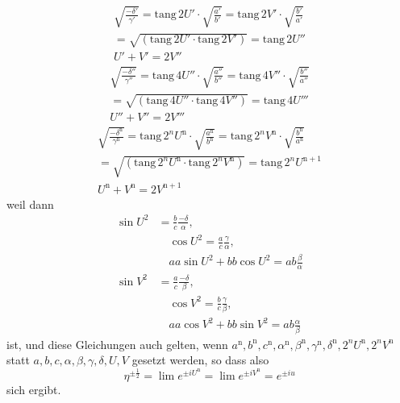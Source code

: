 \[
\begin{gathered}
\surd{\frac{-\delta'}{\gamma'}}
=\mathrm{tang}\,2U'\cdot\surd{\frac{a'}{b'}}
=\mathrm{tang}\,2V'\cdot\surd{\frac{b'}{a'}}
\\=\surd{(\mathrm{tang}\,2U'\cdot\mathrm{tang}\,2V')}
=\mathrm{tang}\,2U''\\
U'+V'=2V''
\end{gathered}
\]
\[
\begin{gathered}
\surd{\frac{-\delta''}{\gamma''}}
=\mathrm{tang}\,4U''\cdot\surd{\frac{a''}{b''}}
=\mathrm{tang}\,4V''\cdot\surd{\frac{b''}{a''}}
\\=\surd{(\mathrm{tang}\,4U''\cdot\mathrm{tang}\,4V'')}
=\mathrm{tang}\,4U'''\\
U''+V''=2V'''
\end{gathered}
\]
\[
\begin{gathered}
\surd{\frac{-\delta^{\mathrm n}}{\gamma^{\mathrm n}}}
=\mathrm{tang}\,2^nU^{\mathrm n}\cdot\surd{\frac{a^{\mathrm n}}{b^{\mathrm n}}}
=\mathrm{tang}\,2^nV^{\mathrm n}\cdot\surd{\frac{b^{\mathrm n}}{a^{\mathrm n}}}
\\=\surd{(\mathrm{tang}\,2^nU^{\mathrm n}\cdot\mathrm{tang}\,2^nV^{\mathrm n})}
=\mathrm{tang}\,2^nU^{\mathrm n+1}\\
U^{\mathrm n}+V^{\mathrm n}=2V^{\mathrm n+1}
\end{gathered}
\]
weil dann
\[
\begin{aligned}
\sin U^2&=\frac bc\frac{-\delta}{\alpha},\\[4pt]&\quad
\cos U^2=\frac ac\frac\gamma\alpha,\\[4pt]&\quad
aa\sin U^2+bb\cos U^2=ab\frac\beta\alpha\\[4pt]
\sin V^2&=\frac ac\frac{-\delta}{\beta},\\[4pt]&\quad
\cos V^2=\frac bc\frac\gamma\beta,\\[4pt]&\quad
aa\cos V^2+bb\sin V^2=ab\frac\alpha\beta
\end{aligned}
\]
ist, und diese Gleichungen auch gelten, wenn $a^{\mathrm n},\allowbreak b^{\mathrm n},\allowbreak c^{\mathrm n},\allowbreak \alpha^{\mathrm n},\allowbreak \beta^{\mathrm n},\allowbreak \gamma^{\mathrm n},\allowbreak \delta^{\mathrm n},\allowbreak 2^nU^{\mathrm n},\allowbreak 2^nV^{\mathrm n}$
statt $a,\allowbreak b,\allowbreak c,\allowbreak \alpha,\allowbreak \beta,\allowbreak \gamma,\allowbreak \delta,\allowbreak U,\allowbreak V$ gesetzt werden, so dass also
\[
\eta^{\pm\frac12}
=\lim e^{\pm iU^{\mathrm n}}=\lim e^{\pm iV^{\mathrm n}}=e^{\pm iu}
\]
sich ergibt.

